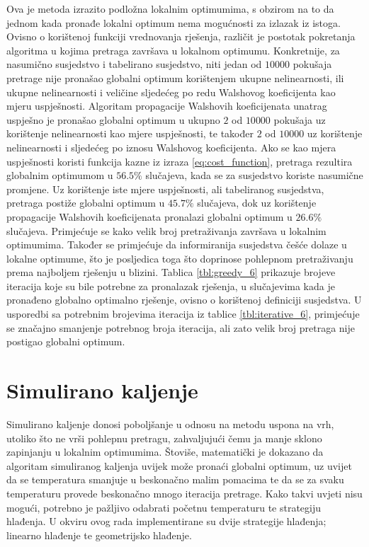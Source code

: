 Ova je metoda izrazito podložna lokalnim optimumima, s obzirom na to da jednom kada pronađe lokalni optimum nema mogućnosti za izlazak iz istoga.
Ovisno o korištenoj funkciji vrednovanja rješenja, različit je postotak pokretanja algoritma u kojima pretraga završava u lokalnom optimumu.
Konkretnije, za nasumično susjedstvo i tabelirano susjedstvo, niti jedan od $10 000$ pokušaja pretrage nije pronašao globalni optimum korištenjem ukupne nelinearnosti, ili ukupne nelinearnosti i veličine sljedećeg po redu Walshovog koeficijenta kao mjeru uspješnosti.
Algoritam propagacije Walshovih koeficijenata unatrag uspješno je pronašao globalni optimum u ukupno $2$ od $10 000$ pokušaja uz korištenje nelinearnosti kao mjere uspješnosti, te također $2$ od $10 000$ uz korištenje nelinearnosti i sljedećeg po iznosu Walshovog koeficijenta.
Ako se kao mjera uspješnosti koristi funkcija kazne iz izraza \eqref{eq:cost_function}, pretraga rezultira globalnim optimumom u $56.5\%$ slučajeva, kada se za susjedstvo koriste nasumične promjene.
Uz korištenje iste mjere uspješnosti, ali tabeliranog susjedstva, pretraga postiže globalni optimum u $45.7\%$ slučajeva, dok uz korištenje propagacije Walshovih koeficijenata pronalazi globalni optimum u $26.6\%$ slučajeva.
Primjećuje se kako velik broj pretraživanja završava u lokalnim optimumima.
Također se primjećuje da informiranija susjedstva češće dolaze u lokalne optimume, što je posljedica toga što doprinose pohlepnom pretraživanju prema najboljem rješenju u blizini.
Tablica \ref{tbl:greedy_6} prikazuje brojeve iteracija koje su bile potrebne za pronalazak rješenja, u slučajevima kada je pronađeno globalno optimalno rješenje, ovisno o korištenoj definiciji susjedstva.
U usporedbi sa potrebnim brojevima iteracija iz tablice \ref{tbl:iterative_6}, primjećuje se značajno smanjenje potrebnog broja iteracija, ali zato velik broj pretraga nije postigao globalni optimum.

\section{Simulirano kaljenje}
Simulirano kaljenje donosi poboljšanje u odnosu na metodu uspona na vrh, utoliko što ne vrši pohlepnu pretragu, zahvaljujući čemu ja manje sklono zapinjanju u lokalnim optimumima.
Štoviše, matematički je dokazano da algoritam simuliranog kaljenja uvijek može pronaći globalni optimum, uz uvijet da se temperatura smanjuje u beskonačno malim pomacima te da se za svaku temperaturu provede beskonačno mnogo iteracija pretrage.
Kako takvi uvjeti nisu mogući, potrebno je pažljivo odabrati početnu temperaturu te strategiju hlađenja.
U okviru ovog rada implementirane su dvije strategije hlađenja; linearno hlađenje te geometrijsko hlađenje.

